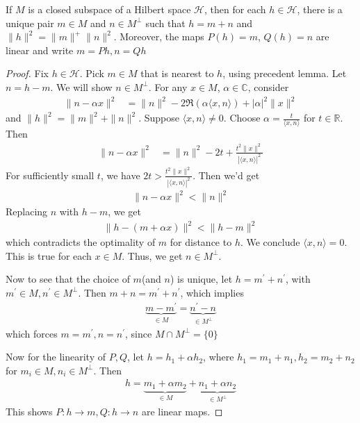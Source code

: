 

\begin{theorem}
  If $M$ is a closed subspace of a Hilbert space $\mathcal{H}$, then
  for each $h \in \mathcal{H}$, there is a unique pair $m \in M$ and
  $ n \in M^\perp$ such that $h = m + n$ and $\|h\|^2 = \|m\|^ +
  \|n\|^2$. Moreover, the maps $P(h) = m$, $Q(h) = n$ are linear and
  write $m = Ph, n = Qh$
\end{theorem}
\begin{proof}
  Fix $h \in \mathcal{H}$. Pick $m \in M$ that is nearest to $h$,
  using precedent lemma. Let $n = h-m$. We will show $ n \in
  M^\perp$. For any $ x \in M$, $\alpha \in \mathbb{C}$, consider
  \begin{align*}
    \|n - \alpha x\|^2 &= \|n\|^2 - 2 \Re (\alpha \langle x , n
    \rangle ) + |\alpha|^2 \|x\|^2
  \end{align*}
  and $\|h\|^2 = \|m\|^2 + \|n\|^2$. Suppose $\langle  x , n \rangle
  \neq 0$. Choose $\alpha = \frac{t}{\langle x , n \rangle }$ for $t \in
  \mathbb{R}$. Then
  \begin{align*}
    \|n - \alpha x\|^2 &= \|n\|^2 - 2t + \frac{t^2\|x\|^2}{|\langle x
    , n \rangle |^2}
  \end{align*}
  For sufficiently small $t$, we have $2t >
  \frac{t^2\|x\|^2}{|\langle x, n \rangle |^2}$. Then we'd get
  \begin{align*}
    \|n - \alpha x\|^2 < \|n\|^2
  \end{align*}
  Replacing $n$ with $h -m$, we get
  \begin{align*}
    \|h - (m + \alpha x)\|^2 < \| h -m\|^2
  \end{align*}
  which contradicts the optimality of $m$ for distance to $h$. We
  conclude $ \langle x , n \rangle = 0$.
  This is true for each $x \in M$. Thus, we get $ n \in M^\perp$.

  Now to see that the choice of $m$(and $n$) is unique, let $h =
  m^\prime + n^\prime$, with $m^\prime \in M, n^\prime \in M^\perp$.
  Then $m + n = m^\prime + n^\prime$, which implies
  \begin{align*}
    \underbrace{m - m^\prime}_{\in M} = \underbrace{n^\prime - n}_{\in M^\perp}
  \end{align*}
  which forces $ m = m^\prime, n = n^\prime$, since $ M \cap M^\perp = \{ 0 \}$

  Now for the linearity of $P, Q$, let $h = h_1 + \alpha h_2$, where
  $h_1 = m_1 + n_1, h_2 = m_2 + n_2$ for $ m_i \in M,
  n_i \in M^\perp$. Then
  \begin{align*}
    h = \underbrace{m_1 + \alpha m_2}_{\in M} + \underbrace{ n_1 +
    \alpha n_2}_{\in M^\perp}
  \end{align*}
  This shows $P: h \to m, Q: h \to n$ are linear maps.
\end{proof}

